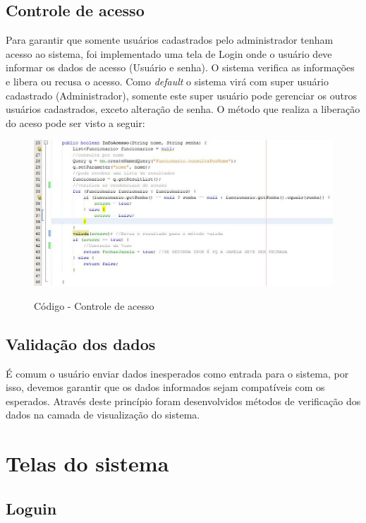     \subsection{Controle de acesso}
    
    Para garantir que somente usuários cadastrados pelo administrador tenham acesso ao sistema, foi implementado uma tela de Login onde o usuário deve informar os dados de acesso (Usuário e senha). O sistema verifica as informações e libera ou recusa o acesso. Como \textit{default} o sistema virá com super usuário cadastrado (Administrador), somente este super usuário pode gerenciar os outros usuários cadastrados, exceto alteração de senha. O método que realiza a liberação do aceso pode ser visto a seguir:
    
\begin{figure}[h]
\centering
\caption{Código - Controle de acesso}
\includegraphics[width=15cm]{imagens/codigo/TrechoAcesso}
\label{fig:Controle de acesso}
\end{figure}
    
     \subsection{Validação dos dados}
     É comum o usuário enviar dados inesperados como entrada para o sistema, por isso, devemos garantir que os dados informados sejam compatíveis com os esperados. Através deste princípio foram desenvolvidos métodos de verificação dos dados na camada de visualização do sistema.
     
    
    
\section{Telas do sistema}
    \subsection{Loguin}
      
